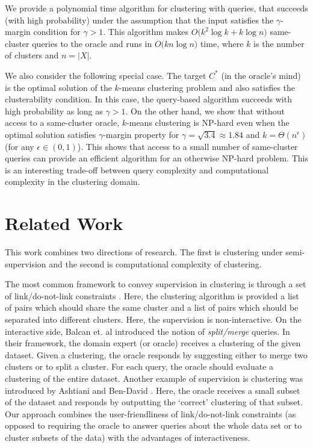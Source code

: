 \documentclass[12pt]{article}
\begin{document}
We provide a polynomial time algorithm for clustering with queries, that succeeds (with high probability) under the assumption that the input satisfies the $\gamma$-margin condition for $\gamma > 1$. This algorithm makes $O\big(k^2\log k + k\log n)$ same-cluster queries to the oracle and runs in $O\big(kn\log n)$ time, where $k$ is the number of clusters and $n = |X|$.

We also consider the following special case. The target $C^*$ (in the oracle's mind) is the optimal solution of the $k$-means clustering problem and also satisfies the clusterability condition. In this case, the query-based algorithm succeeds with high probability as long as $\gamma >1$.  On the other hand, we show that without access to a same-cluster oracle, $k$-means clustering is NP-hard even when the optimal solution satisfies $\gamma$-margin property for $\gamma=\sqrt{3.4} \approx 1.84$ and $k=\Theta(n^\epsilon)$ (for any $\epsilon\in (0,1)$). This shows that access to a small number of same-cluster queries can provide an efficient algorithm for an otherwise NP-hard problem. This is an interesting trade-off between query complexity and computational complexity in the clustering domain. 

\section{Related Work}
This work combines two directions of research. The first is clustering under semi-supervision and the second is computational complexity of clustering. 

The most common framework to convey supervision in clustering is through a set of link/do-not-link constraints \cite{basu2002semi,basu2004probabilistic, kulis2009semi}. Here, the clustering algorithm is provided a list of pairs which should share the same cluster and a list of pairs which should be separated into different clusters. Here, the supervision is non-interactive. On the interactive side, Balcan et. al \cite{balcan2008clustering} introduced the notion of \textit{split/merge} queries. In their framework, the domain expert (or oracle) receives a clustering of the given dataset. Given a clustering, the oracle responds by suggesting either to merge two clusters or to split a cluster. For each query, the oracle should evaluate a clustering of the entire dataset. Another example of supervision is clustering was introduced by Ashtiani and Ben-David \cite{ashtiani2015representation}. Here, the oracle receives a small subset of the dataset and responds by outputting the `correct' clustering of that subset. Our approach combines the user-friendliness of link/do-not-link constraints (as opposed to requiring the oracle to answer queries about the whole data set or to cluster subsets of the data) with the advantages of interactiveness. 
\end{document}
